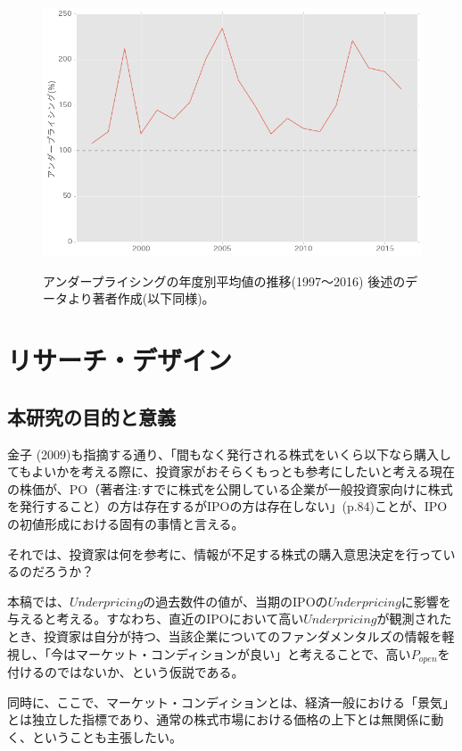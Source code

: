\documentclass{jsarticle}
\begin{document}
\begin{figure}[t]
  \begin{center}
  \caption{アンダープライシングの年度別平均値の推移(1997〜2016) 後述のデータより著者作成(以下同様)。}
    \includegraphics[clip,width=14cm]{./transition.png}
    \label{transition}
  \end{center}
\end{figure}


\section{リサーチ・デザイン}
\subsection{本研究の目的と意義}
金子 (2009)\cite{kaneko}も指摘する通り、「間もなく発行される株式をいくら以下なら購入してもよいかを考える際に、投資家がおそらくもっとも参考にしたいと考える現在の株価が、PO（著者注:すでに株式を公開している企業が一般投資家向けに株式を発行すること）の方は存在するがIPOの方は存在しない」(p.84)ことが、IPOの初値形成における固有の事情と言える。\\ \par
それでは、投資家は何を参考に、情報が不足する株式の購入意思決定を行っているのだろうか？\\ \par
本稿では、$Underpricing$の過去数件の値が、当期のIPOの$Underpricing$に影響を与えると考える。すなわち、直近のIPOにおいて高い$Underpricing$が観測されたとき、投資家は自分が持つ、当該企業についてのファンダメンタルズの情報を軽視し、「今はマーケット・コンディションが良い」と考えることで、高い$P_{open}$を付けるのではないか、という仮説である。\\ \par
同時に、ここで、マーケット・コンディションとは、経済一般における「景気」とは独立した指標であり、通常の株式市場における価格の上下とは無関係に動く、ということも主張したい。\\ \par
\end{document}
